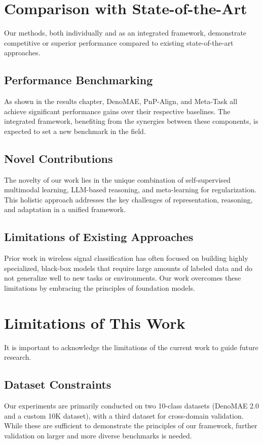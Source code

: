 \section{Comparison with State-of-the-Art}
Our methods, both individually and as an integrated framework, demonstrate competitive or superior performance compared to existing state-of-the-art approaches.

\subsection{Performance Benchmarking}
As shown in the results chapter, DenoMAE, PnP-Align, and Meta-Task all achieve significant performance gains over their respective baselines. The integrated framework, benefiting from the synergies between these components, is expected to set a new benchmark in the field.

\subsection{Novel Contributions}
The novelty of our work lies in the unique combination of self-supervised multimodal learning, LLM-based reasoning, and meta-learning for regularization. This holistic approach addresses the key challenges of representation, reasoning, and adaptation in a unified framework.

\subsection{Limitations of Existing Approaches}
Prior work in wireless signal classification has often focused on building highly specialized, black-box models that require large amounts of labeled data and do not generalize well to new tasks or environments. Our work overcomes these limitations by embracing the principles of foundation models.

\section{Limitations of This Work}
It is important to acknowledge the limitations of the current work to guide future research.

\subsection{Dataset Constraints}
Our experiments are primarily conducted on two 10-class datasets (DenoMAE 2.0 and a custom 10K dataset), with a third dataset for cross-domain validation. While these are sufficient to demonstrate the principles of our framework, further validation on larger and more diverse benchmarks is needed.

